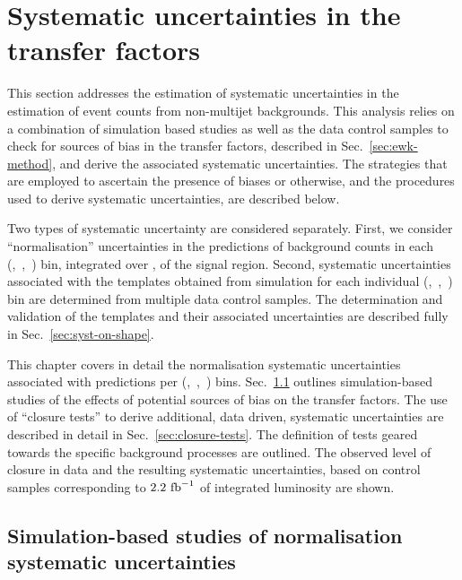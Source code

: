 \section{Systematic uncertainties in the transfer factors}
\label{sec:systematics}

This section addresses the estimation of systematic uncertainties in
the estimation of event counts from non-multijet backgrounds. This
analysis relies on a combination of simulation based studies as well
as the data control samples
to check for sources of bias in the transfer factors, described in
Sec.~\ref{sec:ewk-method}, and derive the associated systematic
uncertainties. The strategies that are employed to ascertain the
presence of biases or otherwise, and the procedures used to derive
systematic uncertainties, are described below.

Two types of systematic uncertainty are considered separately. First,
we consider ``normalisation'' uncertainties in the predictions of
background counts in each (\njet,~\nb,~\scalht) bin, integrated over
\mht, of the signal region. Second, systematic uncertainties
associated with the \mht templates obtained from simulation for each
individual (\njet,~\nb,~\scalht) bin are determined from multiple data
control samples. The determination and validation of the \mht
templates and their associated uncertainties are described fully in
Sec.~\ref{sec:syst-on-shape}.

This chapter covers in detail the normalisation systematic
uncertainties associated with predictions per (\njet,~\nb,~\scalht)
bins. Sec.~\ref{sec:mc-systematics} outlines simulation-based studies of the
effects of potential sources of bias on the transfer factors.
The use of ``closure tests'' to derive additional, data driven, systematic
uncertainties are described in detail in Sec.~\ref{sec:closure-tests}. 
The definition of tests geared
towards the specific background processes are outlined. The observed level 
of closure in data
and the resulting systematic uncertainties, based on control samples
corresponding to $2.2~\ifb$ of integrated luminosity are shown.


\subsection{Simulation-based studies of normalisation systematic uncertainties}
\label{sec:mc-systematics}

